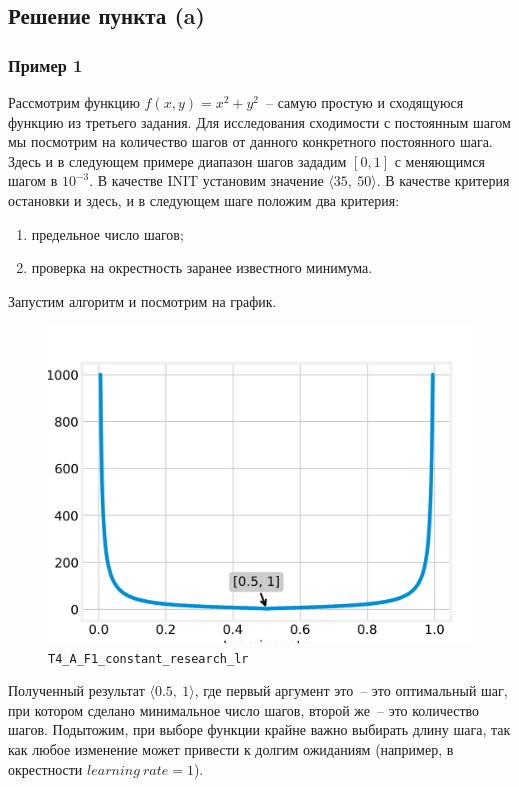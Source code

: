 \documentclass[12pt, a4paper, oneside, final]{article}
\begin{document}
	\subsection*{Решение пункта (a)}
	\subsubsection*{Пример 1}
	Рассмотрим функцию $f(x, y) = x^{2} + y^{2}$~-- самую простую и сходящуюся функцию из третьего задания. Для исследования сходимости с постоянным шагом мы посмотрим на количество шагов от данного конкретного постоянного шага. Здесь и в следующем примере диапазон шагов зададим $[0, 1]$ с меняющимся шагом в $10^{-3}$. В качестве $\text{INIT}$ установим значение $\langle 35, ~ 50 \rangle$. В качестве критерия остановки и здесь, и в следующем шаге положим два критерия:
	\begin{enumerate}[(1)]
		\item предельное число шагов;
		\item проверка на окрестность заранее известного минимума.
	\end{enumerate}
	Запустим алгоритм и посмотрим на график.
	\begin{figure}[H]
		\centering
		\includegraphics[scale=0.68]{Image/T4_A_F1_constant_research_lr.png}
		\caption*{\texttt{T4\_A\_F1\_constant\_research\_lr}}
	\end{figure}
	Полученный результат $\langle 0.5, ~ 1 \rangle$, где первый аргумент это~-- это оптимальный шаг, при котором сделано минимальное число шагов, второй же~-- это количество шагов. Подытожим, при выборе функции крайне важно выбирать длину шага, так как любое изменение может привести к долгим ожиданиям (например, в окрестности $learning~rate = 1$).
\end{document}
